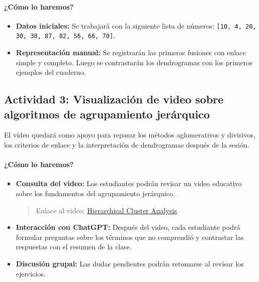 \documentclass[a4,11pt]{aleph-notas}
\begin{document}
\paragraph{¿Cómo lo haremos?}  
\begin{itemize}[leftmargin=*]
    \item \textbf{Datos iniciales:}  
    Se trabajará con la siguiente lista de números: \texttt{[10, 4, 20, 30, 38, 87, 82, 56, 66, 70]}.
    
    \item \textbf{Representación manual:}  
    Se registrarán las primeras fusiones con enlace simple y completo. Luego se contrastarán los dendrogramas con los primeros ejemplos del cuaderno.
    
\end{itemize}

\subsection*{Actividad 3: Visualización de video sobre algoritmos de agrupamiento jerárquico}

El video quedará como apoyo para repasar los métodos aglomerativos y divisivos, los criterios de enlace y la interpretación de dendrogramas después de la sesión.

\paragraph{¿Cómo lo haremos?}  
\begin{itemize}[leftmargin=*]
    \item \textbf{Consulta del video:}
    Los estudiantes podrán revisar un video educativo sobre los fundamentos del agrupamiento jerárquico.
    \begin{quote}
        Enlace al video: \href{https://youtu.be/8QCBl-xdeZI?si=TYfeBv0pZGRS_0zS}{Hierarchical Cluster Analysis}.
    \end{quote}
    
    \item \textbf{Interacción con ChatGPT:}  
    Después del video, cada estudiante podrá formular preguntas sobre los términos que no comprendió y contrastar las respuestas con el resumen de la clase.
    
    \item \textbf{Discusión grupal:}
    Las dudas pendientes podrán retomarse al revisar los ejercicios.
    
\end{itemize}
\end{document}
